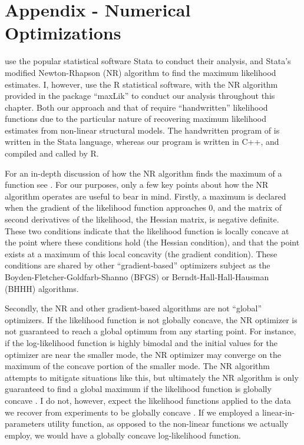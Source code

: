 \documentclass[../main.tex]{subfiles}
\begin{document}
\break
\section{Appendix - Numerical Optimizations}

\textcite{Harrison2016} use the popular statistical software Stata to conduct their analysis, and Stata's modified Newton-Rhapson (NR) algorithm to find the maximum likelihood estimates.
I, however, use the R statistical software, with the NR algorithm provided in the package \enquote{maxLik} to conduct our analysis throughout this chapter.
Both our approach and that of \textcite{Harrison2016} require \enquote{handwritten} likelihood functions due to the particular nature of recovering maximum likelihood estimates from non-linear structural models.
The handwritten program of \textcite{Harrison2016} is written in the Stata language, whereas our program is written in C++, and compiled and called by R.

For an in-depth discussion of how the NR algorithm finds the maximum of a function see \textcite[213-219]{Train2002}.
For our purposes, only a few key points about how the NR algorithm operates are useful to bear in mind.
Firstly, a maximum is declared when the gradient of the likelihood function approaches 0, and the matrix of second derivatives of the likelihood, the Hessian matrix, is negative definite.
These two conditions indicate that the likelihood function is locally concave at the point where these conditions hold (the Hessian condition), and that the point exists at a maximum of this local concavity (the gradient condition).
These conditions are shared by other \enquote{gradient-based} optimizers subject as the Boyden-Fletcher-Goldfarb-Shanno (BFGS) or Berndt-Hall-Hall-Hausman (BHHH) algorithms.

Secondly, the NR and other gradient-based algorithms are not \enquote{global} optimizers.
If the likelihood function is not globally concave, the NR optimizer is not guaranteed to reach a global optimum from any starting point.
For instance, if the log-likelihood function is highly bimodal and the initial values for the optimizer are near the smaller mode, the NR optimizer may converge on the maximum of the concave portion of the smaller mode.
The NR algorithm attempts to mitigate situations like this{\footnotemark}, but ultimately the NR algorithm is only guaranteed to find a global maximum if the likelihood function is globally concave \parencite[218]{Train2002}.
I do not, however, expect the likelihood functions applied to the data we recover from experiments to be globally concave \parencite[227]{Train2002}.
If we employed a linear-in-parameters utility function, as opposed to the non-linear functions we actually employ, we would have a globally concave log-likelihood function.
\end{document}
